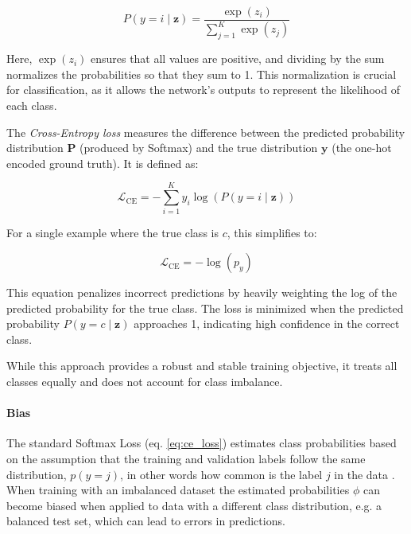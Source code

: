 \begin{equation}
    P(y = i \mid \mathbf{z}) = \frac{\exp(z_i)}{\sum_{j=1}^{K} \exp(z_j)}
\end{equation}

Here, \( \exp(z_i) \) ensures that all values are positive, and dividing by the sum normalizes the probabilities so that they sum to 1. This normalization is crucial for classification, as it allows the network's outputs to represent the likelihood of each class.

The \textit{Cross-Entropy loss} measures the difference between the predicted probability distribution \( \mathbf{P} \) (produced by Softmax) and the true distribution \( \mathbf{y} \) (the one-hot encoded ground truth). It is defined as:

\begin{equation}
    \mathcal{L}_{\text{CE}} = -\sum_{i=1}^{K} y_i \log(P(y = i \mid \mathbf{z}))
\end{equation}

For a single example where the true class is \( c \), this simplifies to:

\begin{equation}
    \label{eq:ce_loss}
    \mathcal{L}_{\text{CE}} = -\log(p_y)
\end{equation}

This equation penalizes incorrect predictions by heavily weighting the log of the predicted probability for the true class. The loss is minimized when the predicted probability \( P(y = c \mid \mathbf{z}) \) approaches 1, indicating high confidence in the correct class.

While this approach provides a robust and stable training objective, it treats all classes equally and does not account for class imbalance.

\paragraph{Bias}
The standard Softmax Loss (eq. \eqref{eq:ce_loss}) estimates class probabilities based on the assumption that the training and validation labels follow the same distribution, $p(y=j)$, in other words how common is the label $j$ in the data \cite{ren2020balancedmetasoftmaxlongtailedvisual}. When training with an imbalanced dataset the estimated probabilities $\phi$ can become biased when applied to data with a different class distribution, e.g. a balanced test set, which can lead to errors in predictions.

